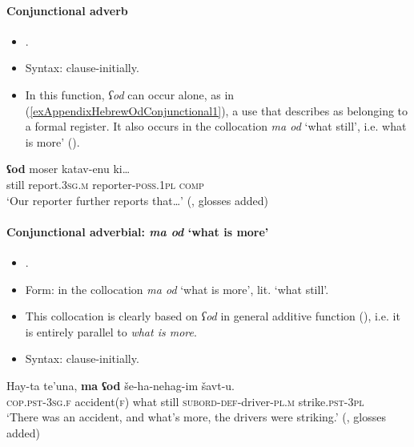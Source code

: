 \paragraph{Conjunctional adverb}\label{appendixHebrewConjunctional}
\begin{itemize}
	\item \textcite[537]{Glinert1989}.
	\item Syntax: clause-initially.
	\item In this function, \textit{ʕod} can occur alone, as in (\ref{exAppendixHebrewOdConjunctional1}), a use that \textcite[537]{Glinert1989} describes as belonging to a formal register. It also occurs in the collocation \textit{ma od} \lq what still', i.e. what is more' ().
\end{itemize}

\begin{exe}
\ex\label{exAppendixHebrewOdConjunctional1}
	\gll \textbf{ʕod} moser katav-enu ki…\\
	still report.3\textsc{sg}.\textsc{m} reporter-\textsc{poss}.1\textsc{pl} \textsc{comp}\\
	\glt \lq Our reporter further reports that…' (\cite[537]{Glinert1989}, glosses added)
\end{exe}


\paragraph{Conjunctional adverbial: \textit{ma od} \lq what is more\rq{}}\label{appendixHebrewWhatIsMore}
\begin{itemize}
	\item \textcite[537]{Glinert1989}.
	\item Form: in the collocation \textit{ma od} \lq what is more\rq{}, lit. \lq{}what still\rq{}.
	\item This collocation is clearly based on \textit{ʕod} in general additive function (), i.e. it is entirely parallel to  \textit{what is more}.
	\item Syntax: clause-initially.
\end{itemize}

\begin{exe}
\ex\label{exAppendixHebrewOdConjunctional2}
	\gll Hay-ta te\rq{}una, \textbf{ma} \textbf{ʕod} še-ha-nehag-im šavt-u.\\
	\textsc{cop}.\textsc{pst}-3\textsc{sg}.\textsc{f} accident(\textsc{f}) what still \textsc{subord}-\textsc{def}-driver-\textsc{pl}.\textsc{m} strike.\textsc{pst}-3\textsc{pl}\\
	\glt \lq There was an accident, and what's more, the drivers were striking.' (\cite[267]{Glinert1989}, glosses added)	
\end{exe}




